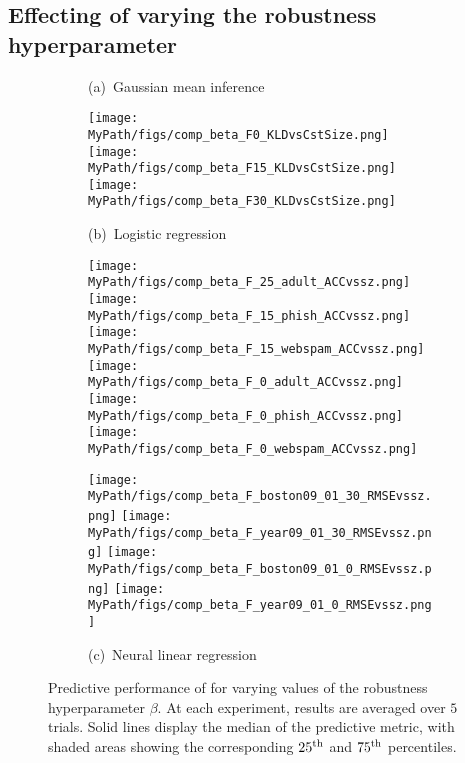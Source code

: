 \subsection{Effecting of varying the robustness hyperparameter}
\label{sec:sensitivity}

\begin{figure}[!tp]
	\begin{subfigure}[]{0.995\textwidth} 
		\centering
		\caption{(a)~Gaussian mean inference~\label{fig:betas_gaussian}}
		\centering
		\texttt{[image: \\MyPath/figs/comp\_beta\_F0\_KLDvsCstSize.png]}
		\centering
		\hfill
		\texttt{[image: \\MyPath/figs/comp\_beta\_F15\_KLDvsCstSize.png]}
		\centering
		\hfill
		\texttt{[image: \\MyPath/figs/comp\_beta\_F30\_KLDvsCstSize.png]}
		\centering
		\caption{(b)~Logistic regression~\label{fig:betas_logreg}}
		\centering 
		\hfill
		\texttt{[image: \\MyPath/figs/comp\_beta\_F\_25\_adult\_ACCvssz.png]}
		\centering
		\hfil
		\texttt{[image: \\MyPath/figs/comp\_beta\_F\_15\_phish\_ACCvssz.png]}
		\centering
		\hfill
		\texttt{[image: \\MyPath/figs/comp\_beta\_F\_15\_webspam\_ACCvssz.png]}
		\centering
		\texttt{[image: \\MyPath/figs/comp\_beta\_F\_0\_adult\_ACCvssz.png]}
		\centering
		\hfill
		\texttt{[image: \\MyPath/figs/comp\_beta\_F\_0\_phish\_ACCvssz.png]}
		\centering
		\hfill
		\texttt{[image: \\MyPath/figs/comp\_beta\_F\_0\_webspam\_ACCvssz.png]}
		\centering
		\caption{(c)~Neural linear regression~\label{fig:betas_neurlinreg}}
		\centering
		\texttt{[image: \\MyPath/figs/comp\_beta\_F\_boston09\_01\_30\_RMSEvssz.png]}
		\centering
		\texttt{[image: \\MyPath/figs/comp\_beta\_F\_year09\_01\_30\_RMSEvssz.png]}
		\centering
		\texttt{[image: \\MyPath/figs/comp\_beta\_F\_boston09\_01\_0\_RMSEvssz.png]}
		\centering
		\texttt{[image: \\MyPath/figs/comp\_beta\_F\_year09\_01\_0\_RMSEvssz.png]}
	\end{subfigure}	
	\centering
	\caption{Predictive performance of \bcores{} for varying values of the robustness hyperparameter $\beta$. At each experiment, results are averaged over $5$ trials. Solid lines display the median of the predictive metric, with shaded areas showing the corresponding $25\textsuperscript{th}$ and $75\textsuperscript{th}$ percentiles.}
	\label{fig:beta_sens}
\end{figure}

